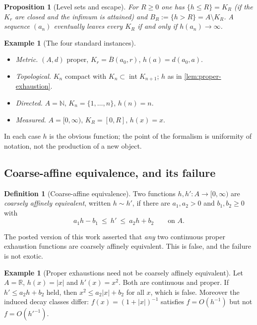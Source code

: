 \documentclass[11pt,a4paper]{article}
\numberwithin{equation}{section}
\theoremstyle{plain}
\newtheorem{proposition}[theorem]{Proposition}
\theoremstyle{definition}
\newtheorem{definition}[theorem]{Definition}
\newtheorem{example}[theorem]{Example}
\theoremstyle{remark}
\newcommand{\R}{\mathbb{R}}
\newcommand{\N}{\mathbb{N}}
\begin{document}
\begin{proposition}[Level sets and escape]\label{prop:level-sets}
For $R\ge0$ one has $\{h\le R\}=K_R$ (if the $K_r$ are closed and the infimum is attained)
and $B_R:=\{h>R\}=A\setminus K_R$. A sequence $(a_n)$ eventually leaves every $K_R$
if and only if $h(a_n)\to\infty$.
\end{proposition}

\begin{example}[The four standard instances]\label{ex:instances}
\leavevmode
\begin{itemize}
\item \emph{Metric.} $(A,d)$ proper, $K_r=\overline{B}(a_0,r)$, $h(a)=d(a_0,a)$.
\item \emph{Topological.} $K_n$ compact with $K_n\subset\operatorname{int}K_{n+1}$;
$h$ as in \cref{lem:proper-exhaustion}.
\item \emph{Directed.} $A=\N$, $K_n=\{1,\dots,n\}$, $h(n)=n$.
\item \emph{Measured.} $A=[0,\infty)$, $K_R=[0,R]$, $h(x)=x$.
\end{itemize}
In each case $h$ is the obvious function; the point of the formalism is uniformity of
notation, not the production of a new object.
\end{example}

\subsection{Coarse-affine equivalence, and its failure}

\begin{definition}[Coarse-affine equivalence]\label{def:coarse-affine}
Two functions $h,h':A\to[0,\infty)$ are \emph{coarsely affinely equivalent}, written
$h\sim h'$, if there are $a_1,a_2>0$ and $b_1,b_2\ge0$ with
\[
a_1 h-b_1\ \le\ h'\ \le\ a_2 h+b_2 \qquad\text{on }A .
\]
\end{definition}

The posted version of this work asserted that \emph{any} two continuous proper exhaustion
functions are coarsely affinely equivalent. This is false, and the failure is not exotic.

\begin{example}[Proper exhaustions need not be coarsely affinely equivalent]
\label{ex:no-coarse-affine}
Let $A=\R$, $h(x)=|x|$ and $h'(x)=x^{2}$. Both are continuous and proper. If
$h'\le a_2h+b_2$ held, then $x^{2}\le a_2|x|+b_2$ for all $x$, which is false. Moreover
the induced decay classes differ: $f(x)=(1+|x|)^{-1}$ satisfies $f=O(h^{-1})$ but not
$f=O(h'^{-1})$.
\end{example}
\end{document}
